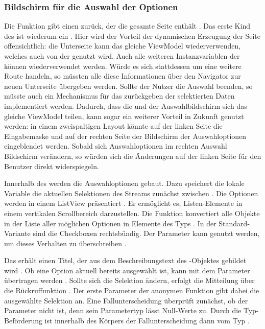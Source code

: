 \subsubsection{Bildschirm für die Auswahl der Optionen}

 
Die Funktion  \Lst{\ref{lst:Schritt1FunktionCreateMultipleChoiceSelectionScreen}} gibt einen  zurück, der die gesamte Seite enthält . Das erste Kind des  ist wiederum ein  . Hier wird der Vorteil der dynamischen Erzeugung der Seite offensichtlich: die Unterseite kann das gleiche ViewModel wiederverwenden, welches auch von der  genutzt wird.  Auch alle weiteren Instanzvariablen der  können wiederverwendet werden. Würde es sich stattdessen um eine weitere Route handeln, so müssten alle diese Informationen über den Navigator zur neuen Unterseite übergeben werden. Sollte der Nutzer die Auswahl beenden, so müsste auch ein Mechanismus für das zurückgeben der selektierten Daten implementiert werden.
Dadurch, dass die  und der Auswahlbildschirm sich das gleiche ViewModel teilen, kann sogar ein weiterer Vorteil in Zukunft genutzt werden: in einem zweispaltigen Layout könnte auf der linken Seite die Eingabemaske und auf der rechten Seite der Bildschirm der Auswahloptionen eingeblendet werden. Sobald sich Auswahloptionen im rechten Auswahl Bildschirm verändern, so würden sich die Änderungen auf der linken Seite für den Benutzer direkt widerspiegeln.

Innerhalb des  werden die Auswahloptionen gebaut. Dazu speichert die lokale Variable  die aktuellen Selektionen des Streams zunächst zwischen . Die Optionen werden in einem ListView präsentiert . Er ermöglicht es, Listen-Elemente in einem vertikalen Scrollbereich darzustellen. Die Funktion  konvertiert alle Objekte in der Liste aller möglichen Optionen  in Elemente des Typs  . In der Standard-Variante sind die Checkboxen rechtsbündig. Der Parameter  kann genutzt werden, um dieses Verhalten zu überschreiben . 

Das  erhält einen Titel, der aus dem Beschreibungstext  des -Objektes gebildet wird . Ob eine Option aktuell bereits ausgewählt ist, kann mit dem Parameter  übertragen werden . Sollte sich die Selektion ändern, erfolgt die Mitteilung über die Rückruffunktion  . Der erste Parameter der anonymen Funktion gibt dabei die ausgewählte Selektion an. Eine Fallunterscheidung überprüft zunächst, ob der Parameter  nicht  ist, denn sein Parametertyp  lässt Null-Werte zu. Durch die Typ-Beförderung ist  innerhalb des Körpers der Fallunterscheidung dann vom Typ  . 


